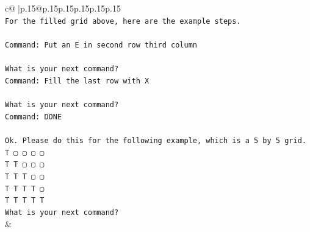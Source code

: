 \documentclass{article}
\begin{document}
{\begin{supertabular}{c@{$\;$}|p{.15\linewidth}@{}p{.15\linewidth}p{.15\linewidth}p{.15\linewidth}p{.15\linewidth}p{.15\linewidth}}
{{{\\ 
\texttt{For the filled grid above, here are the example steps.} \\
\\ 
\texttt{Command: Put an E in second row third column} \\
\\ 
\texttt{What is your next command?} \\
\texttt{Command: Fill the last row with X} \\
\\ 
\texttt{What is your next command?} \\
\texttt{Command: DONE} \\
\\ 
\texttt{Ok. Please do this for the following example, which is a 5 by 5 grid.} \\
\texttt{T ▢ ▢ ▢ ▢} \\
\texttt{T T ▢ ▢ ▢} \\
\texttt{T T T ▢ ▢} \\
\texttt{T T T T ▢} \\
\texttt{T T T T T} \\
\texttt{What is your next command?} \\
            }
        }
    }
    & \\ \\


\end{supertabular}}
\end{document}

